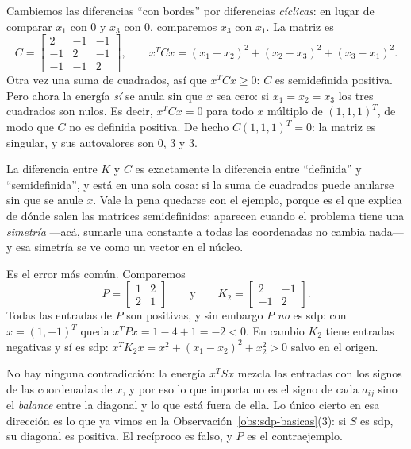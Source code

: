 \begin{example}\label{ej:C}
Cambiemos las diferencias ``con bordes'' por diferencias \emph{cíclicas}: en
lugar de comparar $x_1$ con $0$ y $x_3$ con $0$, comparemos $x_3$ con $x_1$.
La matriz es
\[
C=\begin{bmatrix} 2 & -1 & -1\\ -1 & 2 & -1\\ -1 & -1 & 2\end{bmatrix} ,
\qquad
x^TCx = (x_1-x_2)^2 + (x_2-x_3)^2 + (x_3-x_1)^2 .
\]
Otra vez una suma de cuadrados, así que $x^TCx\ge0$: $C$ es semidefinida
positiva. Pero ahora la energía \emph{sí} se anula sin que $x$ sea cero: si
$x_1=x_2=x_3$ los tres cuadrados son nulos. Es decir,
$x^TCx=0$ para todo $x$ múltiplo de $(1,1,1)^T$, de modo que $C$ no es
definida positiva. De hecho $C(1,1,1)^T=0$: la matriz es singular, y sus
autovalores son $0$, $3$ y $3$.

La diferencia entre $K$ y $C$ es exactamente la diferencia entre ``definida''
y ``semidefinida'', y está en una sola cosa: si la suma de cuadrados puede
anularse sin que se anule $x$. Vale la pena quedarse con el ejemplo, porque es
el que explica de dónde salen las matrices semidefinidas: aparecen cuando el
problema tiene una \emph{simetría} ---acá, sumarle una constante a todas las
coordenadas no cambia nada--- y esa simetría se ve como un vector en el núcleo.
\end{example}

\begin{example}\label{ej:trampa}
Es el error más común. Comparemos
\[
P=\begin{bmatrix} 1 & 2\\ 2 & 1\end{bmatrix}
\qquad\text{y}\qquad
K_2=\begin{bmatrix} 2 & -1\\ -1 & 2\end{bmatrix} .
\]
Todas las entradas de $P$ son positivas, y sin embargo $P$ \emph{no} es sdp:
con $x=(1,-1)^T$ queda $x^TPx = 1-4+1=-2<0$. En cambio $K_2$ tiene entradas
negativas y sí es sdp: $x^TK_2x = x_1^2+(x_1-x_2)^2+x_2^2>0$ salvo en el
origen.

No hay ninguna contradicción: la energía $x^TSx$ mezcla las entradas con los
signos de las coordenadas de $x$, y por eso lo que importa no es el signo de
cada $a_{ij}$ sino el \emph{balance} entre la diagonal y lo que está fuera de
ella. Lo único cierto en esa dirección es lo que ya vimos en la
Observación~\ref{obs:sdp-basicas}(3): si $S$ es sdp, su diagonal es positiva.
El recíproco es falso, y $P$ es el contraejemplo.
\end{example}

